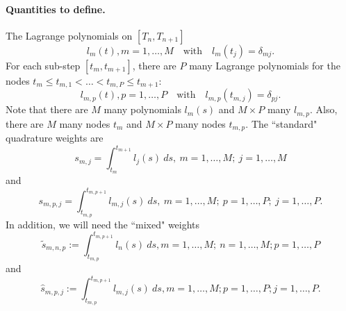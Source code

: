\documentclass{article}
\begin{document}
\paragraph{Quantities to define.}
The Lagrange polynomials on $[T_n, T_{n+1}]$
\begin{equation}
	l_m(t), m = 1, \ldots, M \quad \text{with} \quad l_m(t_j) = \delta_{mj}.
\end{equation}
For each sub-step $[t_m, t_{m+1}]$, there are $P$ many Lagrange polynomials for the nodes $t_{m} \leq t_{m,1} < \ldots < t_{m,P} \leq t_{m+1}$:
\begin{equation}
	l_{m,p}(t), p=1, \ldots, P \quad \text{with} \quad l_{m,p}(t_{m,j}) = \delta_{pj}.
\end{equation}
Note that there are $M$ many polynomials $l_m(s)$ and $M \times P$ many $l_{m,p}$.
Also, there are $M$ many nodes $t_m$ and $M \times P$ many nodes $t_{m,p}$.
The ``standard" quadrature weights are
\begin{equation}
	s_{m,j} = \int_{t_m}^{t_{m+1}} l_j(s)~ds, \ m=1, \ldots, M; \ j=1, \ldots, M
\end{equation}
and
\begin{equation}
	s_{m,p,j} = \int_{t_{m,p}}^{t_{m,p+1}}  l_{m,j}(s)~ds, \ m=1, \ldots, M; \ p=1, \ldots, P; \ j=1, \ldots, P.
\end{equation}
In addition, we will need the ``mixed" weights
\begin{equation}
	\tilde{s}_{m,n,p} := \int_{t_{m,p}}^{t_{m,p+1}} l_{n}(s)~ds, m=1, \ldots, M; \ n=1, \ldots, M; p=1, \ldots, P
\end{equation}
and
\begin{equation}
	\hat{s}_{m,p,j} := \int_{t_{m,p}}^{t_{m,p+1}} l_{m,j}(s)~ds, m=1, \ldots, M; p=1, \ldots, P; j=1, \ldots, P.
\end{equation}

\end{document}
